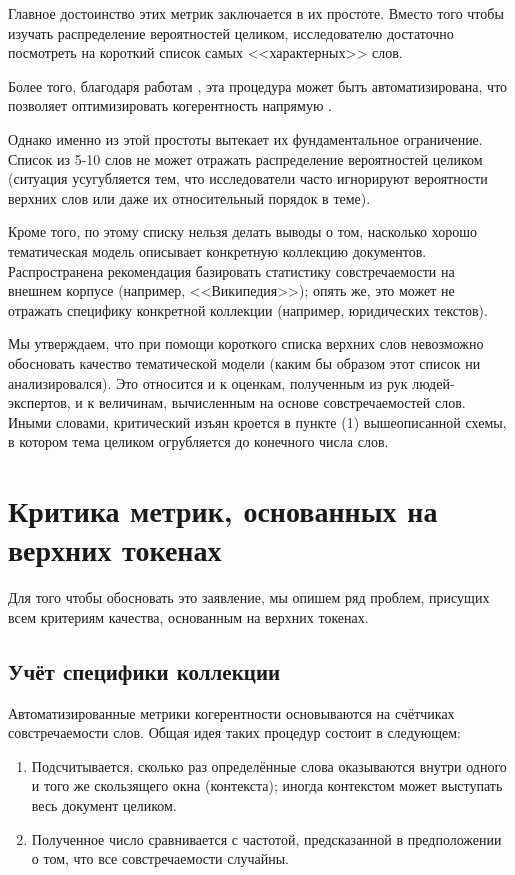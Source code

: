 Главное достоинство этих метрик заключается в их простоте. Вместо того чтобы изучать распределение вероятностей целиком, исследователю достаточно посмотреть на короткий список самых <<характерных>> слов.

Более того, благодаря работам \cite{mrtl,mimno2011,aletras2013evaluating,roder2015exploring}, эта процедура может быть автоматизирована, что позволяет оптимизировать когерентность напрямую \cite{4keys}.

Однако именно из этой простоты вытекает их фундаментальное ограничение. Список из 5-10 слов не может отражать распределение вероятностей целиком (ситуация усугубляется тем, что исследователи часто игнорируют вероятности верхних слов или даже их относительный порядок в теме).

Кроме того, по этому списку нельзя делать выводы о том, насколько хорошо тематическая модель описывает конкретную коллекцию документов. Распространена рекомендация базировать статистику совстречаемости на внешнем корпусе (например, <<Википедия>>); опять же, это может не отражать специфику конкретной коллекции (например, юридических текстов).

Мы утверждаем, что при помощи короткого списка верхних слов невозможно обосновать качество тематической модели (каким бы образом этот список ни анализировался). Это относится и к оценкам, полученным из рук людей-экспертов, и к величинам, вычисленным на основе совстречаемостей слов. Иными словами, критический изъян кроется в пункте (1) вышеописанной схемы, в котором тема целиком огрубляется до конечного числа слов.

\section{Критика метрик, основанных на верхних токенах}


Для того чтобы обосновать это заявление, мы опишем ряд проблем, присущих всем критериям качества, основанным на верхних токенах.

\subsection{Учёт специфики коллекции} \label{sec:corpus_agnostic}

Автоматизированные метрики когерентности основываются на счётчиках совстречаемости слов. Общая идея таких процедур состоит в следующем:

\begin{enumerate}
    \item Подсчитывается, сколько раз определённые слова оказываются внутри одного и того же скользящего окна (контекста); иногда контекстом может выступать весь документ целиком.
    \item Полученное число сравнивается с частотой, предсказанной в предположении о том, что все совстречаемости случайны.
\end{enumerate}

